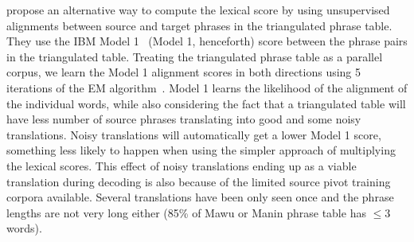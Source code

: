 \documentclass[11pt]{article}
\begin{document}
 \label{sec:model1} \cite{Cohn:07} propose an alternative way to compute the lexical score by using unsupervised alignments between source and target phrases in the triangulated phrase table. They use the IBM Model 1~\cite{Brown:1993} (Model 1, henceforth) score between the phrase pairs in the triangulated table. Treating the triangulated phrase table as a parallel corpus, we learn the Model 1 alignment scores in both directions using 5 iterations of the EM algorithm~\cite{Dempster:77}. 
%
%
Model 1 learns the likelihood of the alignment of the individual words, while also considering the fact that a triangulated table will have less number of source phrases translating into good and some noisy translations. Noisy translations will automatically get a lower Model 1 score, something less likely to happen when using the simpler approach of multiplying the lexical scores. This effect of noisy translations ending up as a viable translation during decoding is also because of the limited source pivot training corpora available. Several translations have been only seen once and the phrase lengths are not very long either (85\% of Mawu or Manin phrase table has $\leq 3$ words).

\end{document}
